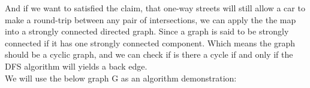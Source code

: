 \documentclass{article}
\begin{document}
\noindent And if we want to satisfied the claim, that one-way streets will still allow a car to make a round-trip between any pair of intersections, we can apply the the map into a strongly connected directed graph. Since a graph is said to be strongly connected if it has one strongly connected component. Which means the graph should be a cyclic graph, and we can check if is there a cycle if and only if the DFS algorithm will yields a back edge.\\

\noindent We will use the below graph G as an algorithm demonstration:\\


\begin{center}
\end{center}
\end{document}
